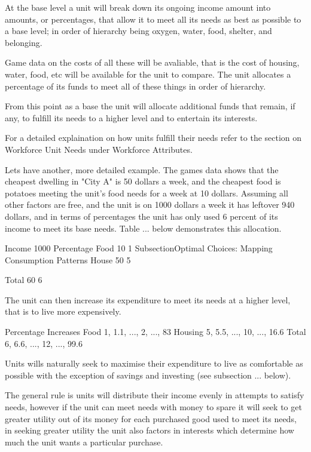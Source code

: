
At the base level a unit will break down its ongoing income amount into amounts, or percentages, that allow it to meet all its needs as best as possible to a base level; in order of hierarchy being oxygen, water, food, shelter, and belonging.

Game data on the costs of all these will be avaliable, that is the cost of housing, water, food, etc will be available for the unit to compare. The unit  allocates a percentage of its funds to meet all of these things in order of hierarchy.

From this point as a base the unit will allocate additional funds that remain, if any, to fulfill its needs to a higher level and to entertain its interests. 

For a detailed explaination on how units fulfill their needs refer to the section on Workforce Unit Needs under Workforce Attributes.


Lets have another, more detailed example. The games data shows that the cheapest dwelling in "City A" is 50 dollars a week, and the cheapest food is potatoes  meeting the unit's food needs for a week at 10 dollars. Assuming all other factors are free, and the unit is on 1000 dollars a week it has leftover 940 dollars, and in terms of percentages the unit has only used 6 percent of its income to meet its base needs. Table ... below demonstrates this allocation.

Income	1000	
                    Percentage 
Food	  10	  	 1	Subsection{Optimal Choices: Mapping Consumption Patterns}
House	  50	  	 5

Total	  60	  	 6


The unit can then increase its expenditure to meet its needs at a higher level, that is to live more expensively.

	 Percentage Increases	
Food	 1, 1.1, ...,  2,  ...,  83 
Housing	 5, 5.5, ..., 10,  ...,  16.6
Total	 6, 6.6, ..., 12,  ...,  99.6

Units wills naturally seek to maximise their expenditure to live as comfortable as possible with the exception of savings and investing (see subsection ... below).

The general rule is units will distribute their income evenly in attempts to satisfy needs, however if the unit can meet needs with money to spare it will seek to get greater utility out of its money for each purchased good used to meet its needs, in seeking greater utility the unit also factors in interests which determine how much the unit wants a particular purchase.

